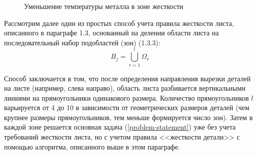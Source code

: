 \documentclass[11pt,twoside,openany]{report}
\newcounter{lem}
\begin{document}
\begin{figure}
  \centering
  \caption{Уменьшение температуры металла в зоне жесткости }
  \label{thermal-550-130}
\end{figure}



Рассмотрим далее один из простых способ учета правила жесткости листа,
описанного в параграфе 1.3,
основанный на делении области листа на
последовательный набор подобластей (зон) (1.3.3):
$$
B_j =
\bigcup_{r=1}^l \Omega_r
$$

Способ заключается в том,
что после определения направления вырезки деталей на листе
(например, слева направо),
область листа разбивается вертикальными линиями
на прямоугольники одинакового размера.
Количество прямоугольников $l$
варьируется от 4 до 10 в зависимости от
геометрических размеров деталей
(чем крупнее размеры прямоугольников,
тем меньше формируется число зон).
Затем в каждой зоне решается основная задача (\ref{problem-statement})
уже без учета требований жесткости листа,
но с учетом правила <<жесткости детали>>
с помощью  алгоритма, описанного выше в этом параграфе.
\end{document}
